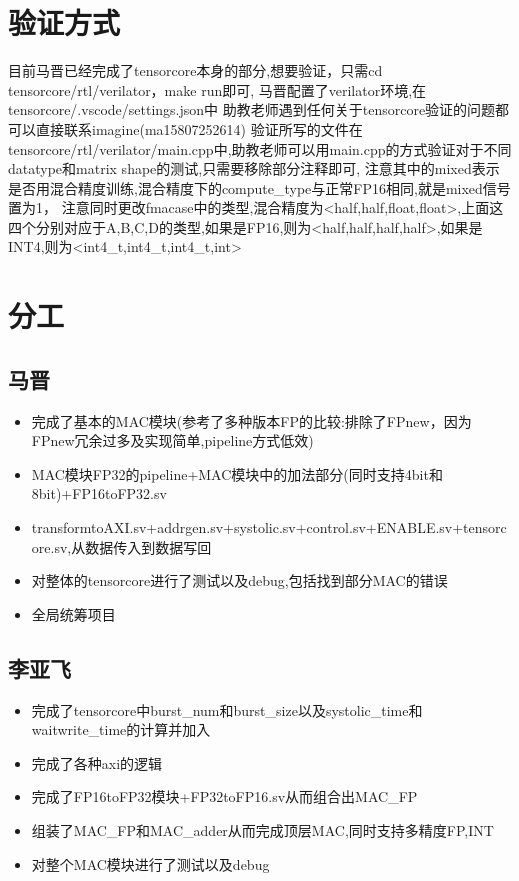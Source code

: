 \documentclass[zihao=-4, UTF8]{ctexart}
\begin{document}
\section{验证方式}
目前马晋已经完成了tensorcore本身的部分,想要验证，只需cd tensorcore/rtl/verilator，make run即可,
马晋配置了verilator环境,在tensorcore/.vscode/settings.json中
助教老师遇到任何关于tensorcore验证的问题都可以直接联系imagine(ma15807252614)
验证所写的文件在tensorcore/rtl/verilator/main.cpp中,助教老师可以用main.cpp的方式验证对于不同datatype和matrix shape的测试,只需要移除部分注释即可,
注意其中的mixed表示是否用混合精度训练,混合精度下的compute\_type与正常FP16相同,就是mixed信号置为1，
注意同时更改fmacase中的类型,混合精度为<half,half,float,float>,上面这四个分别对应于A,B,C,D的类型,如果是FP16,则为<half,half,half,half>,如果是INT4,则为<int4\_t,int4\_t,int4\_t,int>

\section{分工}
\subsection{马晋}
\begin{itemize}
  \item 完成了基本的MAC模块(参考了多种版本FP的比较:排除了FPnew，因为FPnew冗余过多及实现简单,pipeline方式低效)
  \item MAC模块FP32的pipeline+MAC模块中的加法部分(同时支持4bit和8bit)+FP16toFP32.sv
  \item transformtoAXI.sv+addrgen.sv+systolic.sv+control.sv+ENABLE.sv+tensorcore.sv,从数据传入到数据写回
  \item 对整体的tensorcore进行了测试以及debug,包括找到部分MAC的错误
  \item 全局统筹项目
\end{itemize}
\subsection{李亚飞}
\begin{itemize}
    \item 完成了tensorcore中burst\_num和burst\_size以及systolic\_time和waitwrite\_time的计算并加入
    \item 完成了各种axi的逻辑
    \item 完成了FP16toFP32模块+FP32toFP16.sv从而组合出MAC\_FP
    \item 组装了MAC\_FP和MAC\_adder从而完成顶层MAC,同时支持多精度FP,INT
    \item 对整个MAC模块进行了测试以及debug
\end{itemize}
\end{document}
